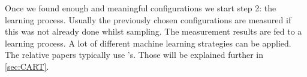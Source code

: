 Once we found enough and meaningful configurations we start step 2: the learning process. Usually the previously chosen configurations are measured if this was not already done whilst sampling. The measurement results are fed to a learning process. A lot of different machine learning strategies can be applied\cite{VAMOSConference}. The relative papers typically use \CART's. Those will be explained further in \cref{sec:CART}.


%







